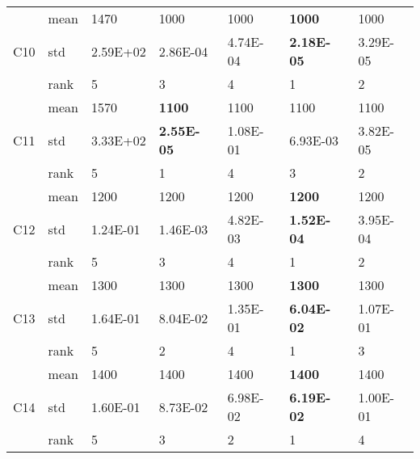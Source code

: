 \begin{table}[]
\begin{tabular}{|l|l|l|l|l|l|l|}
\multirow{3}{*}{C10} & mean & 1470              & 1000              & 1000              & \textbf{1000}     & 1000              \\ \cline{2-7} 
                     & std  & 2.59E+02          & 2.86E-04          & 4.74E-04          & \textbf{2.18E-05} & 3.29E-05          \\ \cline{2-7} 
                     & rank & 5                 & 3                 & 4                 & 1                 & 2                 \\ \hline
\multirow{3}{*}{C11} & mean & 1570              & \textbf{1100}     & 1100              & 1100              & 1100              \\ \cline{2-7} 
                     & std  & 3.33E+02          & \textbf{2.55E-05} & 1.08E-01          & 6.93E-03          & 3.82E-05          \\ \cline{2-7} 
                     & rank & 5                 & 1                 & 4                 & 3                 & 2                 \\ \hline
\multirow{3}{*}{C12} & mean & 1200              & 1200              & 1200              & \textbf{1200}     & 1200              \\ \cline{2-7} 
                     & std  & 1.24E-01          & 1.46E-03          & 4.82E-03          & \textbf{1.52E-04} & 3.95E-04          \\ \cline{2-7} 
                     & rank & 5                 & 3                 & 4                 & 1                 & 2                 \\ \hline
\multirow{3}{*}{C13} & mean & 1300              & 1300              & 1300              & \textbf{1300}     & 1300              \\ \cline{2-7} 
                     & std  & 1.64E-01          & 8.04E-02          & 1.35E-01          & \textbf{6.04E-02} & 1.07E-01          \\ \cline{2-7} 
                     & rank & 5                 & 2                 & 4                 & 1                 & 3                 \\ \hline
\multirow{3}{*}{C14} & mean & 1400              & 1400              & 1400              & \textbf{1400}     & 1400              \\ \cline{2-7} 
                     & std  & 1.60E-01          & 8.73E-02          & 6.98E-02          & \textbf{6.19E-02} & 1.00E-01          \\ \cline{2-7} 
                     & rank & 5                 & 3                 & 2                 & 1                 & 4                 \\ \hline

\end{tabular}
\end{table}
